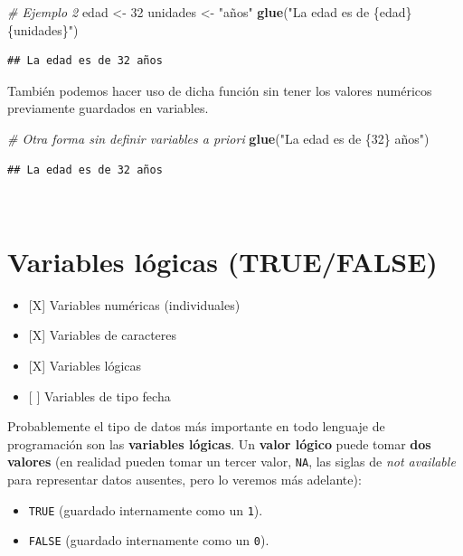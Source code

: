 \documentclass[11pt,]{book}
\newenvironment{Shaded}{\begin{snugshade}}{\end{snugshade}}
\newcommand{\CommentTok}[1]{\textcolor[rgb]{0.37,0.37,0.37}{\textit{#1}}}
\newcommand{\DecValTok}[1]{\textcolor[rgb]{0.06,0.06,0.06}{#1}}
\newcommand{\KeywordTok}[1]{\textcolor[rgb]{0.27,0.27,0.27}{\textbf{#1}}}
\newcommand{\NormalTok}[1]{#1}
\newcommand{\StringTok}[1]{\textcolor[rgb]{0.5,0.5,0.5}{#1}}
\providecommand{\tightlist}{%
  \setlength{\itemsep}{0pt}\setlength{\parskip}{0pt}}
\begin{document}
\begin{Shaded}
\begin{Highlighting}[]
\CommentTok{# Ejemplo 2}
\NormalTok{edad <-}\StringTok{ }\DecValTok{32}
\NormalTok{unidades <-}\StringTok{ "años"}
\KeywordTok{glue}\NormalTok{(}\StringTok{"La edad es de \{edad\} \{unidades\}"}\NormalTok{)}
\end{Highlighting}
\end{Shaded}

\begin{verbatim}
## La edad es de 32 años
\end{verbatim}

También podemos hacer uso de dicha función sin tener los valores numéricos previamente guardados en variables.

\begin{Shaded}
\begin{Highlighting}[]
\CommentTok{# Otra forma sin definir variables a priori}
\KeywordTok{glue}\NormalTok{(}\StringTok{"La edad es de \{32\} años"}\NormalTok{)}
\end{Highlighting}
\end{Shaded}

\begin{verbatim}
## La edad es de 32 años
\end{verbatim}

~

\hypertarget{logicas}{%
\section{Variables lógicas (TRUE/FALSE)}\label{logicas}}

\begin{itemize}
\tightlist
\item
  {[}X{]} Variables numéricas (individuales)
\item
  {[}X{]} Variables de caracteres
\item
  {[}X{]} Variables lógicas
\item
  {[} {]} Variables de tipo fecha
\end{itemize}

Probablemente el tipo de datos más importante en todo lenguaje de programación son las \textbf{variables lógicas}. Un \textbf{valor lógico} puede tomar \textbf{dos valores} (en realidad pueden tomar un tercer valor, \texttt{NA}, las siglas de \emph{not available} para representar datos ausentes, pero lo veremos más adelante):

\begin{itemize}
\tightlist
\item
  \texttt{TRUE} (guardado internamente como un \texttt{1}).
\item
  \texttt{FALSE} (guardado internamente como un \texttt{0}).
\end{itemize}
\end{document}
